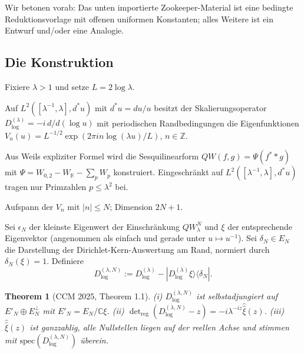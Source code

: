 \documentclass[11pt,a4paper]{article}
\theoremstyle{plain}
\newtheorem{theorem}{Theorem}[section]
\theoremstyle{definition}
\newcommand{\C}{\mathbb{C}}
\newcommand{\R}{\mathbb{R}}
\newcommand{\Z}{\mathbb{Z}}
\begin{document}
Wir betonen vorab: Das unten importierte Zookeeper-Material ist eine
bedingte Reduktionsvorlage mit offenen uniformen Konstanten; alles Weitere
ist ein Entwurf und/oder eine Analogie.

\subsection{Die Konstruktion}
\label{sec:ccm-construction}

Fixiere $\lambda > 1$ und setze $L = 2 \log\lambda$.

\begin{description}[leftmargin=*,style=nextline]
\item[\textbf{Skalierungs-Tripel.}] Auf $L^2([\lambda^{-1}, \lambda],
  d^\ast u)$ mit $d^\ast u = du/u$ besitzt der Skalierungsoperator
  $D^{(\lambda)}_{\log} = -i\,d/d(\log u)$ mit periodischen Randbedingungen
  die Eigenfunktionen $V_n(u) = L^{-1/2}\exp(2\pi i n \log(\lambda u)/L)$, $n \in \Z$.
\item[\textbf{Weil-Quadratische Form.}] Aus Weils expliziter Formel
  wird die Sesquilinearform $QW(f,g) = \Psi(f^\ast * g)$ mit $\Psi =
  W_{0,2} - W_\R - \sum_p W_p$ konstruiert. Eingeschränkt auf
  $L^2([\lambda^{-1}, \lambda], d^\ast u)$ tragen nur Primzahlen $p \leq
  \lambda^2$ bei.
\item[\textbf{Test-Unterraum $E_N$.}] Aufspann der $V_n$ mit $|n|
  \leq N$; Dimension $2N+1$.
\item[\textbf{Störung vom Rang eins.}] Sei $\epsilon_N$ der
  kleinste Eigenwert der Einschränkung $QW_\lambda^N$ und $\xi$
  der entsprechende Eigenvektor (angenommen als einfach und gerade unter $u
  \mapsto u^{-1}$). Sei $\delta_N \in E_N$ die Darstellung der Dirichlet-Kern-Auswertung
  am Rand, normiert durch $\delta_N(\xi) = 1$. Definiere
  \[
     D^{(\lambda,N)}_{\log} := D^{(\lambda)}_{\log}
       - |D^{(\lambda)}_{\log}\xi\rangle\langle\delta_N|.
  \]
\end{description}

\begin{theorem}[CCM 2025, Theorem 1.1]\label{thm:ccm-mainthm}
(i) $D^{(\lambda,N)}_{\log}$ ist selbstadjungiert auf $E'_N \oplus
E_N^\perp$ mit $E'_N = E_N/\C\xi$.
(ii) $\det_{\mathrm{reg}}(D^{(\lambda,N)}_{\log} - z) = -i
\lambda^{-iz}\widehat{\widehat\xi}(z)$.
(iii) $\widehat{\widehat\xi}(z)$ ist ganzzahlig, alle Nullstellen liegen auf der
reellen Achse und stimmen mit $\mathrm{spec}(D^{(\lambda,N)}_{\log})$ überein.
\end{theorem}
\end{document}
